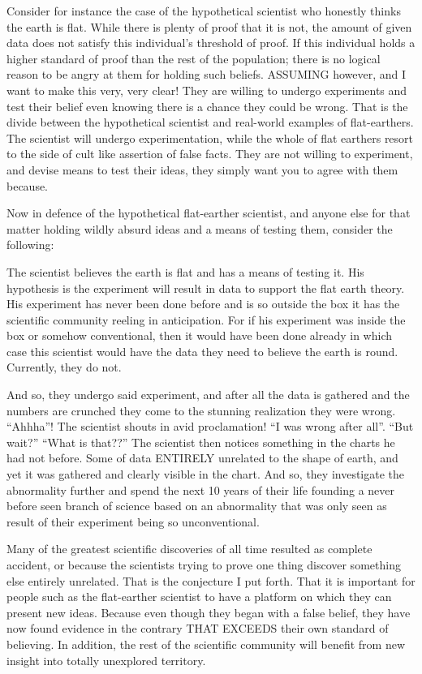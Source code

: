Consider for instance the case of the hypothetical scientist who honestly thinks
the earth is flat. While there is plenty of proof that it is not, the amount of
given data does not satisfy this individual's threshold of proof. If this
individual holds a higher standard of proof than the rest of the population; there
is no logical reason to be angry at them for holding such beliefs. ASSUMING
however, and I want to make this very, very clear! They are willing to undergo
experiments and test their belief even knowing there is a chance they could be
wrong. That is the divide between the hypothetical scientist and real-world
examples of flat-earthers. The scientist will undergo experimentation, while the
whole of flat earthers resort to the side of cult like assertion of false facts.
They are not willing to experiment, and devise means to test their ideas, they
simply want you to agree with them because.

Now in defence of the hypothetical flat-earther scientist, and anyone else for
that matter holding wildly absurd ideas and a means of testing them, consider the
following:

The scientist believes the earth is flat and has a means of testing it. His
hypothesis is the experiment will result in data to support the flat earth theory.
His experiment has never been done before and is so outside the box it has the
scientific community reeling in anticipation. For if his experiment was inside the
box or somehow conventional, then it would have been done already in which case
this scientist would have the data they need to believe the earth is round.
Currently, they do not.

And so, they undergo said experiment, and after all the data is gathered and the
numbers are crunched they come to the stunning realization they were wrong.
``Ahhha''! The scientist shouts in avid proclamation! ``I was wrong after all''.
``But wait?'' ``What is that??'' The scientist then notices something in the
charts he had not before. Some of data ENTIRELY unrelated to the shape of earth,
and yet it was gathered and clearly visible in the chart. And so, they investigate
the abnormality further and spend the next 10 years of their life founding a never
before seen branch of science based on an abnormality that was only seen as result
of their experiment being so unconventional.

Many of the greatest scientific discoveries of all time resulted as
complete accident, or because the scientists trying to prove one thing discover
something else entirely unrelated. That is the conjecture I put forth. That it is
important for people such as the flat-earther scientist to have a platform on
which they can present new ideas. Because even though they began with a false
belief, they have now found evidence in the contrary THAT EXCEEDS their own
standard of believing. In addition, the rest of the scientific community will
benefit from new insight into totally unexplored territory.

